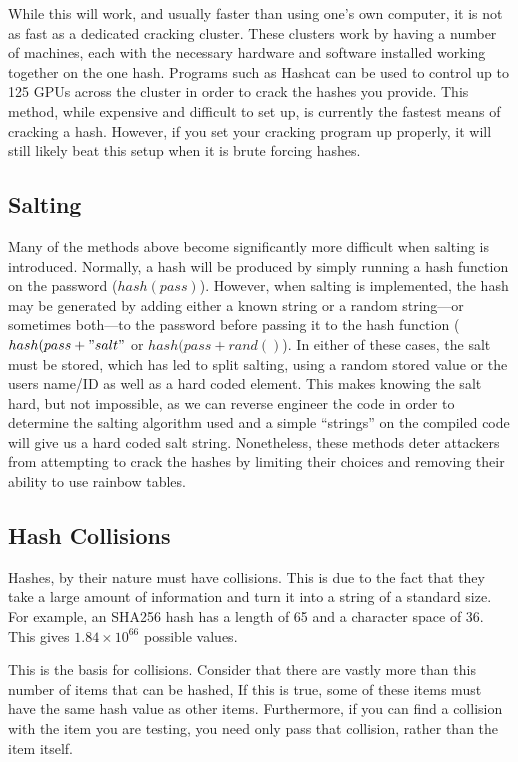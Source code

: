 			While this will work, and usually faster than using one's own computer, it is not as fast as a dedicated cracking cluster. 
			These clusters work by having a number of machines, each with the necessary hardware and software installed working together on the one hash. 
			Programs such as Hashcat can be used to control up to 125 GPUs across the cluster in order to crack the hashes you provide. 
			This method, while expensive and difficult to set up, is currently the fastest means of cracking a hash. 
			However, if you set your cracking program up properly, it will still likely beat this setup when it is brute forcing hashes. 
		\subsection{Salting}
			Many of the methods above become significantly more difficult when salting is introduced. 
			Normally, a hash will be produced by simply running a hash function on the password ($hash(pass)$). 
			However, when salting is implemented, the hash may be generated by adding either a known string or a random string---or sometimes both---to the password before passing it to the hash function ($hash(pass + "salt"$ or $hash(pass + rand()$).
			In either of these cases, the salt must be stored, which has led to split salting, using a random stored value or the users name/ID as well as a hard coded element. 
			This makes knowing the salt hard, but not impossible, as we can reverse engineer the code in order to determine the salting algorithm used and a simple ``strings'' on the compiled code will give us a hard coded salt string. 
			Nonetheless, these methods deter attackers from attempting to crack the hashes by limiting their choices and removing their ability to use rainbow tables. 
		\subsection{Hash Collisions}
			Hashes, by their nature must have collisions. 
			This is due to the fact that they take a large amount of information and turn it into a string of a standard size. 
			For example, an SHA256 hash has a length of 65 and a character space of 36. 
			This gives $1.84\times10^{66}$ possible values. 

			This is the basis for collisions. 
			Consider that there are vastly more than this number of items that can be hashed, 
			If this is true, some of these items must have the same hash value as other items.
			Furthermore, if you can find a collision with the item you are testing, you need only pass that collision, rather than the item itself. 

